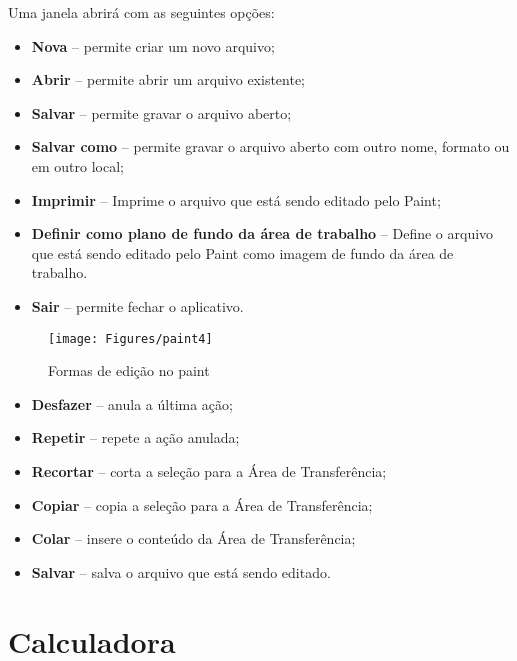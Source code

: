 \documentclass[hidelinks,12pt]{article}
\begin{document}
Uma janela abrirá com as seguintes opções:

\begin{itemize}
	\item {\bf Nova} – permite criar um novo arquivo;

	\item {\bf Abrir} – permite abrir um arquivo existente;

	\item {\bf Salvar} – permite gravar o arquivo aberto;

	\item {\bf Salvar como} – permite gravar o arquivo aberto com outro nome, formato ou em outro local;

	\item {\bf Imprimir} – Imprime o arquivo que está sendo editado pelo Paint;

	\item {\bf Definir como plano de fundo da área de trabalho} – Define o arquivo que está sendo editado pelo Paint como imagem de fundo da área de trabalho.

	\item {\bf Sair} – permite fechar o aplicativo.
\end{itemize}
\bigskip
\begin{figure}[!h]
	\centering
	\texttt{[image: Figures/paint4]}
	\label{fig:paint4}
	\caption{Formas de edição no paint}
\end{figure}

\begin{itemize}
	\item {\bf Desfazer} – anula a última ação;

	\item {\bf Repetir} – repete a ação anulada;

	\item {\bf Recortar} – corta a seleção para a Área de Transferência;

	\item {\bf Copiar} – copia a seleção para a Área de Transferência;

	\item {\bf Colar} – insere o conteúdo da Área de Transferência;

	\item {\bf Salvar} – salva o arquivo que está sendo editado.
\end{itemize}

\section{Calculadora}
\end{document}
